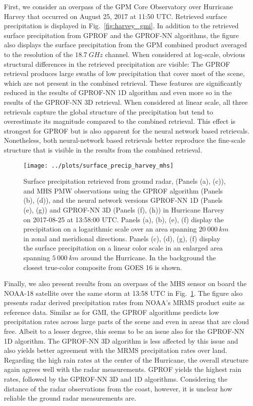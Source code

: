 \documentclass[a4paper,11pt,bibtotoc]{scrartcl}
\begin{document}
First, we consider an overpass of the GPM Core Observatory over Hurricane Harvey
that occurred on August 25, 2017 at 11:50 UTC. Retrieved surface precipitation
is displayed in Fig.~\ref{fig:harvey_gmi}. In addition to the retrieved
surface precipitation from GPROF and the GPROF-NN algorithms, the figure also
displays the surface precipitation from the GPM combined product averaged to the
resolution of the $18.7\ \unit{GHz}$ channel. When considered at log-scale,
obvious structural differences in the retrieved precipitation are visible: The
GPROF retrieval produces large swaths of low precipitation that cover most of
the scene, which are not present in the combined retrieval. These features are
significantly reduced in the results of GPROF-NN 1D algorithm and even more so
in the results of the GPROF-NN 3D retrieval. When considered at linear scale,
all three retrievals capture the global structure of the precipitation but
tend to overestimate its magnitude compared to the combined retrieval. This
effect is strongest for GPROF but is also apparent for the neural network
based retrievals. Nonetheless, both neural-network based retrievals better
reproduce the fine-scale structure that is visible in the results from
the combined retrieval.

\begin{figure}[hbpt]
  \centering
  \texttt{[image: ../plots/surface\_precip\_harvey\_mhs]}
  \caption{Surface precipitation retrieved from ground radar, (Panels (a), (c)),
    and MHS PMW observations using the GPROF algorithm (Panels (b), (d)), and
    the neural network versions GPROF-NN 1D (Panels (e), (g)) and GPROF-NN 3D
    (Panels (f), (h)) in Hurricane Harvey on 2017-08-25 at 13:58:00
    UTC. Panels (a), (b), (e), (f) display the precipitation on a logarithmic
    scale over an area spanning $20\ 000\ \unit{km}$ in zonal and meridional
    directions. Panels (c), (d), (g), (f) display the surface precipitation on a
    linear color scale in an enlarged area spanning $5\ 000\ \unit{km}$ around
    the Hurricane. In the background the closest true-color composite from GOES
    16 is shown. }
  \label{fig:harvey_mhs}
\end{figure}

Finally, we also present results from an overpass of the MHS sensor on board the
NOAA-18 satellite over the same storm at 13:58 UTC in
Fig.~\ref{fig:harvey_mhs}. The figure also presents radar derived
precipitation rates from NOAA's MRMS product suite as reference data. Similar as
for GMI, the GPROF algorithms predicts low precipitation rates across large
parts of the scene and even in areas that are cloud free. Albeit to a lesser
degree, this seems to be an issue also for the GPROF-NN 1D algorithm. The
GPROF-NN 3D algorithm is less affected by this issue and also yields better
agreement with the MRMS precipitation rates over land. Regarding the high rain
rates at the center of the Hurricane, the overall structure again agrees well
with the radar measurements. GPROF yields the highest rain rates, followed by
the GPROF-NN 3D and 1D algorithms. Considering the distance of the radar
observations from the coast, however, it is unclear how reliable the ground
radar measurements are.
\end{document}
